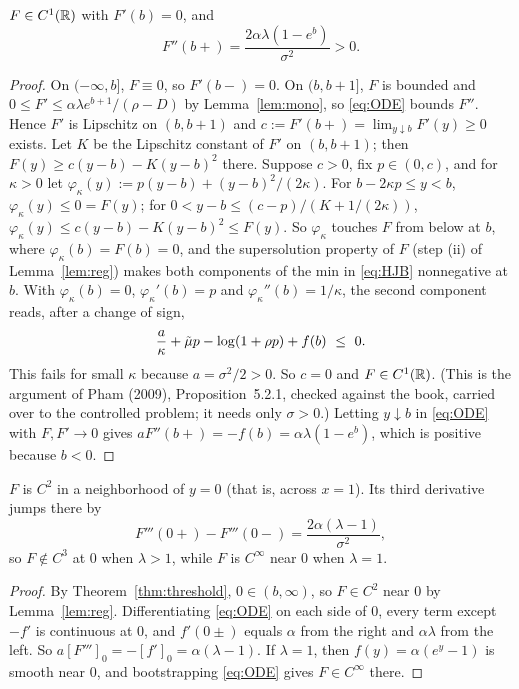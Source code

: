 \begin{alemma}\label{lem:sf}
$F\in C^1(\mathbb{R})$ with $F'(b)=0$, and
\[
F''(b+)=\frac{2\alpha\lambda(1-e^b)}{\sigma^2}>0 .
\]
\end{alemma}

\begin{proof}
On $(-\infty,b]$, $F\equiv0$, so $F'(b-)=0$. On $(b,b+1]$, $F$ is bounded and $0\le F'\le\alpha\lambda e^{b+1}/(\rho-D)$ by Lemma~\ref{lem:mono}, so \eqref{eq:ODE} bounds $F''$. Hence $F'$ is Lipschitz on $(b,b+1)$ and $c:=F'(b+)=\lim_{y\downarrow b}F'(y)\ge0$ exists. Let $K$ be the Lipschitz constant of $F'$ on $(b,b+1)$; then $F(y)\ge c(y-b)-K(y-b)^2$ there. Suppose $c>0$, fix $p\in(0,c)$, and for $\kappa>0$ let $\varphi_\kappa(y):=p(y-b)+(y-b)^2/(2\kappa)$. For $b-2\kappa p\le y<b$, $\varphi_\kappa(y)\le0=F(y)$; for $0<y-b\le(c-p)/(K+1/(2\kappa))$, $\varphi_\kappa(y)\le c(y-b)-K(y-b)^2\le F(y)$. So $\varphi_\kappa$ touches $F$ from below at $b$, where $\varphi_\kappa(b)=F(b)=0$, and the supersolution property of $F$ (step (ii) of Lemma~\ref{lem:reg}) makes both components of the min in \eqref{eq:HJB} nonnegative at $b$. With $\varphi_\kappa(b)=0$, $\varphi_\kappa'(b)=p$ and $\varphi_\kappa''(b)=1/\kappa$, the second component reads, after a change of sign,
\[
\frac{a}{\kappa}+\mut p-\log(1+\rho p)+f(b)\ \le\ 0 .
\]
This fails for small $\kappa$ because $a=\sigma^2/2>0$. So $c=0$ and $F\in C^1(\mathbb{R})$. (This is the argument of Pham (2009), Proposition~5.2.1, checked against the book, carried over to the controlled problem; it needs only $\sigma>0$.) Letting $y\downarrow b$ in \eqref{eq:ODE} with $F,F'\to0$ gives $aF''(b+)=-f(b)=\alpha\lambda(1-e^b)$, which is positive because $b<0$.
\end{proof}

\begin{alemma}\label{lem:kink}
$F$ is $C^2$ in a neighborhood of $y=0$ (that is, across $x=1$). Its third derivative jumps there by
\[
F'''(0+)-F'''(0-)=\frac{2\alpha(\lambda-1)}{\sigma^2},
\]
so $F\notin C^3$ at $0$ when $\lambda>1$, while $F$ is $C^\infty$ near $0$ when $\lambda=1$.
\end{alemma}

\begin{proof}
By Theorem~\ref{thm:threshold}, $0\in(b,\infty)$, so $F\in C^2$ near $0$ by Lemma~\ref{lem:reg}. Differentiating \eqref{eq:ODE} on each side of $0$, every term except $-f'$ is continuous at $0$, and $f'(0\pm)$ equals $\alpha$ from the right and $\alpha\lambda$ from the left. So $a[F''']_0=-[f']_0=\alpha(\lambda-1)$. If $\lambda=1$, then $f(y)=\alpha(e^y-1)$ is smooth near $0$, and bootstrapping \eqref{eq:ODE} gives $F\in C^\infty$ there.
\end{proof}


